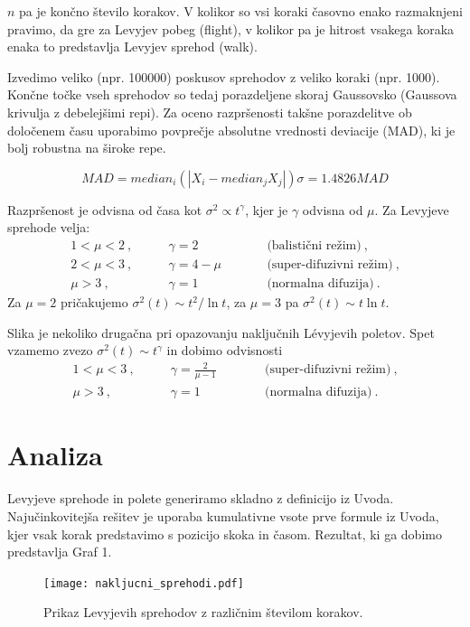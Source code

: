 \documentclass[12pt, a4paper]{article}
\begin{document}
$n$ pa je končno število korakov. V kolikor so vsi koraki časovno enako razmaknjeni pravimo, da gre za Levyjev pobeg (flight), v kolikor pa je hitrost vsakega koraka enaka to predstavlja Levyjev sprehod (walk).

Izvedimo veliko (npr. 100000) poskusov sprehodov z veliko koraki (npr. 1000). Končne točke vseh sprehodov so tedaj porazdeljene skoraj Gaussovsko (Gaussova krivulja z debelejšimi repi). 
Za oceno razpršenosti takšne porazdelitve ob določenem času uporabimo povprečje absolutne vrednosti deviacije (MAD), ki je bolj robustna na široke repe.

\begin{equation*}
  MAD = median_i (|X_i - median_j X_j|)
  \sigma = 1.4826 MAD
\end{equation*}

Razpršenost je odvisna od časa kot $\sigma^2 \propto t^\gamma$, kjer je $\gamma$ odvisna od $\mu$. Za Levyjeve sprehode velja:
\begin{align*}
  1 < \mu < 2 \>, &\qquad \gamma = 2 \> &\qquad&  \text{(balistični režim)}\>, \\
  2 < \mu < 3 \>, &\qquad \gamma = 4 - \mu &\qquad&  \text{(super-difuzivni režim)}\>, \\
      \mu > 3 \>, &\qquad \gamma = 1 &\qquad&  \text{(normalna difuzija)} \>.
  \end{align*}
  Za $\mu=2$ pričakujemo $\sigma^2(t) \sim t^2 / \ln t$,
  za $\mu=3$ pa $\sigma^2(t) \sim t \ln t$.
  
  Slika je nekoliko drugačna pri opazovanju naključnih L\'evyjevih poletov.
  Spet vzamemo zvezo $\sigma^2(t) \sim t^\gamma$ in dobimo odvisnosti
  \begin{align*}
  1 < \mu < 3 \>, &\qquad \gamma = \frac{2}{\mu-1} \> &\qquad&  \text{(super-difuzivni režim)}\>, \\
      \mu > 3 \>, &\qquad \gamma = 1 &\qquad&  \text{(normalna difuzija)} \>.
  \end{align*}
    
\section{Analiza}
  Levyjeve sprehode in polete generiramo skladno z definicijo iz Uvoda. Najučinkovitejša rešitev je uporaba kumulativne vsote prve formule iz Uvoda, kjer vsak korak predstavimo s pozicijo skoka in časom. Rezultat, ki ga dobimo predstavlja Graf 1.

  \begin{figure}[hbtp]
    \begin{center}
    \texttt{[image: nakljucni\_sprehodi.pdf]}
    \end{center}
    \vspace*{-7mm}
    \caption{Prikaz Levyjevih sprehodov z različnim številom korakov.}
  \end{figure}
\end{document}
